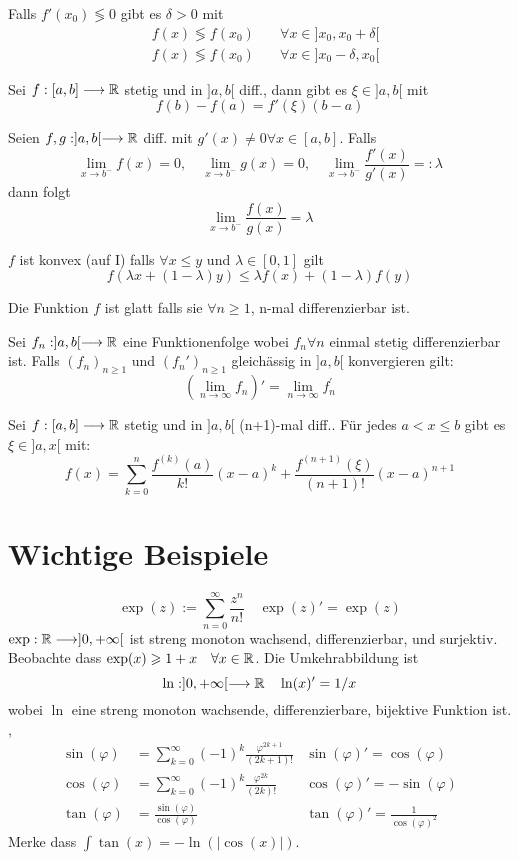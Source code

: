 \Satz Falls $f'(x_0) \lessgtr 0$ gibt es $\delta > 0$ mit
\begin{align*}
	&f(x) \lessgtr f(x_0) \quad &\forall x \in ]x_0, x_0+\delta[ \\
	&f(x) \lessgtr f(x_0) \quad &\forall x \in ]x_0-\delta, x_0[ 
\end{align*}

\Satz[Lagrange] Sei $f:[a,b] \longrightarrow \mathbb{R}$ stetig und in $]a,b[$ diff., dann gibt es $\xi \in ]a,b[$ mit
$$f(b)-f(a) = f'(\xi)(b-a)$$

\Satz[L'Hospital] Seien $f,g: ]a,b[ \longrightarrow \mathbb{R}$ diff. mit $g'(x) \neq 0 \forall x \in [a,b]$. Falls
$$\lim _{x \rightarrow b^{-}} f(x)=0, \quad \lim _{x \rightarrow b^{-}} g(x)=0, \quad \lim _{x \rightarrow b^{-}} \frac{f'(x)}{g'(x)}=:\lambda$$
dann folgt
$$\lim _{x \rightarrow b^{-}} \frac{f(x)}{g(x)}=\lambda$$


\Def[Konvex] $f$ ist konvex (auf I) falls $\forall x \leq y$ und $\lambda \in [0,1]$ gilt
$$f(\lambda x+(1-\lambda) y) \leqslant \lambda f(x)+(1-\lambda) f(y)$$

\Def[Glatt] Die Funktion $f$ ist glatt falls sie $\forall n \geq 1$, n-mal differenzierbar ist.

\Satz[Funktionenfolgen] Sei $f_n:]a,b[ \longrightarrow \mathbb{R}$ eine Funktionenfolge wobei $f_n \forall n$ einmal stetig differenzierbar ist. Falls $(f_n)_{n\geqslant1}$ und $(f_n')_{n\geqslant1}$ gleichässig in $]a,b[$ konvergieren gilt:
$$(\lim _{n \rightarrow \infty} f_{n})'=\lim _{n \rightarrow \infty} f_{n}^{\prime}$$

 Sei $f:[a,b] \longrightarrow \mathbb{R}$ stetig und in $]a,b[$ (n+1)-mal diff.. Für jedes $a<x\leqslant b$ gibt es $\xi \in ]a,x[$ mit:
$$f(x)=\sum_{k=0}^{n} \frac{f^{(k)}(a)}{k !}(x-a)^{k}+\frac{f^{(n+1)}(\xi)}{(n+1) !}(x-a)^{n+1}$$


\section{Wichtige Beispiele}
\Bsp[Exponentialfunktion]
$$\exp (z):=\sum_{n=0}^{\infty} \frac{z^{n}}{n !} \quad \exp (z)' = \exp(z)$$
$\exp : \mathbb{R} \longrightarrow] 0,+\infty[$ ist streng monoton wachsend, differenzierbar, und surjektiv. Beobachte dass $\exp (x) \geqslant 1+x \quad \forall x \in \mathbb{R}$.
Die Umkehrabbildung ist 
$$\ln :] 0,+\infty[\longrightarrow \mathbb{R} \quad \ln (x)' = 1/x$$
wobei $\ln$ eine streng monoton wachsende, differenzierbare, bijektive Funktion ist.
\sep
{}
\begin{align*}
\sin(\varphi)  
& =\sum_{k=0}^{\infty} (-1)^k \frac{\varphi^{2k+1}}{(2k+1)!} &\sin(\varphi)' = \cos(\varphi)  \\
\cos(\varphi)  
& = \sum_{k=0}^{\infty} (-1)^k \frac{\varphi^{2k}}{(2k)!} &\cos(\varphi)' = -\sin(\varphi) \\
\tan(\varphi)  
& = \frac{\sin(\varphi)}{\cos(\varphi)} & \tan(\varphi)' = \frac{1}{\cos(\varphi)^2} 
\end{align*}
Merke dass $\int \tan(x) = -\ln(|\cos(x)|)$.

